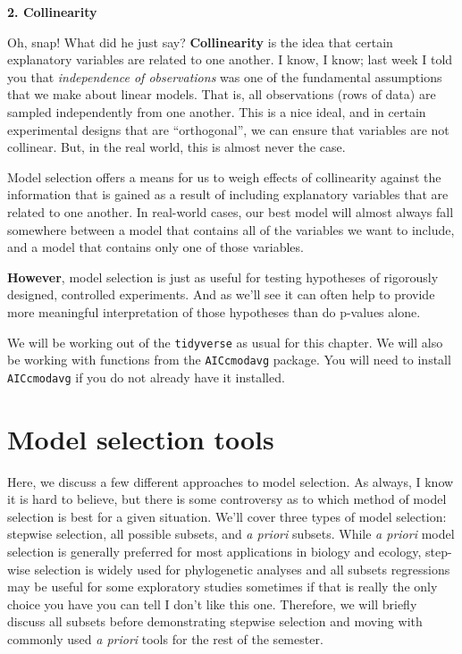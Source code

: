 \documentclass[
]{book}
\begin{document}
\textbf{2. Collinearity}

Oh, snap! What did he just say? \textbf{Collinearity} is the idea that certain explanatory variables are related to one another. I know, I know; last week I told you that \emph{independence of observations} was one of the fundamental assumptions that we make about linear models. That is, all observations (rows of data) are sampled independently from one another. This is a nice ideal, and in certain experimental designs that are ``orthogonal'', we can ensure that variables are not collinear. But, in the real world, this is almost never the case.

Model selection offers a means for us to weigh effects of collinearity against the information that is gained as a result of including explanatory variables that are related to one another. In real-world cases, our best model will almost always fall somewhere between a model that contains all of the variables we want to include, and a model that contains only one of those variables.

\textbf{However}, model selection is just as useful for testing hypotheses of rigorously designed, controlled experiments. And as we'll see it can often help to provide more meaningful interpretation of those hypotheses than do p-values alone.

We will be working out of the \texttt{tidyverse} as usual for this chapter. We will also be working with functions from the \texttt{AICcmodavg} package. You will need to install \texttt{AICcmodavg} if you do not already have it installed.

\hypertarget{model-selection-tools}{%
\section{Model selection tools}\label{model-selection-tools}}

Here, we discuss a few different approaches to model selection. As always, I know it is hard to believe, but there is some controversy as to which method of model selection is best for a given situation. We'll cover three types of model selection: stepwise selection, all possible subsets, and \emph{a priori} subsets. While \emph{a priori} model selection is generally preferred for most applications in biology and ecology, step-wise selection is widely used for phylogenetic analyses and all subsets regressions may be useful for some exploratory studies sometimes if that is really the only choice you have you can tell I don't like this one. Therefore, we will briefly discuss all subsets before demonstrating stepwise selection and moving with commonly used \emph{a priori} tools for the rest of the semester.
\end{document}
